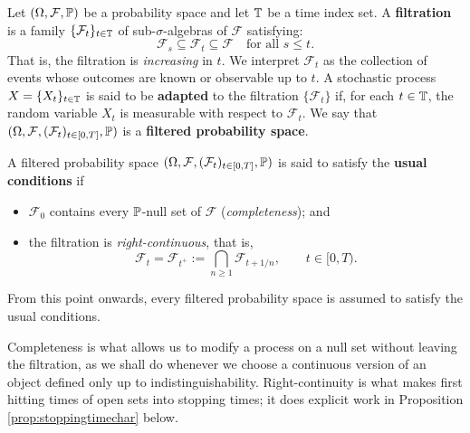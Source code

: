 \begin{definition}[Filtration]
Let \((\Omega, \mathcal{F}, \mathbb{P})\) be a probability space and let \(\mathbb{T}\) be a time index set. A \textbf{filtration} is a family \(\{\mathcal{F}_t\}_{t \in \mathbb{T}}\) of sub-\(\sigma\)-algebras of \(\mathcal{F}\) satisfying:
\begin{equation}
\mathcal{F}_s \subseteq \mathcal{F}_t \subseteq \mathcal{F} \quad \text{for all } s \leq t.
\end{equation}
That is, the filtration is \emph{increasing} in \(t\). We interpret \(\mathcal{F}_t\) as the collection of events whose outcomes are known or observable up to  \(t\). A stochastic process \(X = \{X_t\}_{t \in \mathbb{T}}\) is said to be \textbf{adapted} to the filtration \(\{\mathcal{F}_t\}\) if, for each \(t \in \mathbb{T}\), the random variable \(X_t\) is measurable with respect to \(\mathcal{F}_t\).  We say that $(\Omega,\mathcal{F},(\mathcal{F}_t)_{t\in[0,T]},\mathbb{P})$ is a \textbf{filtered probability space}.
\end{definition}


\begin{definition}\label{def:usualconditions}
A filtered probability space $(\Omega,\mathcal{F},(\mathcal{F}_t)_{t\in[0,T]},\mathbb{P})$ is said to satisfy the \textbf{usual conditions} if
\begin{itemize}
    \item[i)] $\mathcal{F}_0$ contains every $\mathbb{P}$-null set of $\mathcal{F}$ (\emph{completeness}); and
    \item[ii)] the filtration is \emph{right-continuous}, that is,
    \begin{equation}\label{eq:rightcontinuous}
    \mathcal{F}_t = \mathcal{F}_{t^+} := \bigcap_{n\geq 1}\mathcal{F}_{t + 1/n}, \qquad t \in [0,T).
    \end{equation}
\end{itemize}
\end{definition}

\begin{convention}\label{conv:usualconditions}
From this point onwards, every filtered probability space is assumed to satisfy the usual conditions.
\end{convention}

Completeness is what allows us to modify a process on a null set without leaving the filtration, as we shall do whenever we choose a continuous version of an object defined only up to
indistin\-guishability. Right-continuity is what makes first hitting times of open sets into
stopping times; it does explicit work in Proposition \ref{prop:stoppingtimechar} below.

